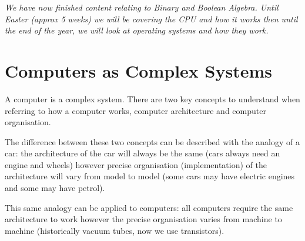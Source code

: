 
\textit{We have now finished content relating to Binary and Boolean Algebra. Until Easter (approx 5 weeks) we will be covering the CPU and how it works then until the end of the year, we will look at operating systems and how they work.}

\section*{Computers as Complex Systems}
A computer is a complex system. There are two key concepts to understand when referring to how a computer works, computer architecture and computer organisation.

The difference between these two concepts can be described with the analogy of a car: the architecture of the car will always be the same (cars always need an engine and wheels) however precise organisation (implementation) of the architecture will vary from model to model (some cars may have electric engines and some may have petrol).

This same analogy can be applied to computers: all computers require the same architecture to work however the precise organisation varies from machine to machine (historically vacuum tubes, now we use transistors).


